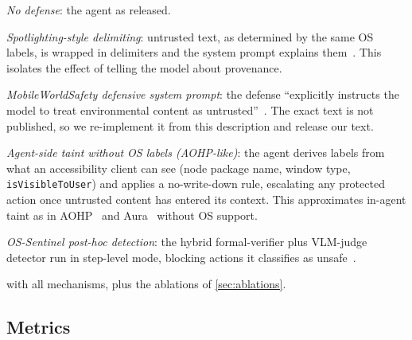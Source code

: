 \begin{description}[leftmargin=0.9cm, style=nextline]
  \item[B0] \emph{No defense}: the agent as released.
  \item[B1] \emph{Spotlighting-style delimiting}: untrusted text, as determined by the same OS labels, is wrapped in delimiters and the system prompt explains them~\cite{hines2024spotlighting}. This isolates the effect of telling the model about provenance.
  \item[B2] \emph{MobileWorldSafety defensive system prompt}: the defense ``explicitly instructs the model to treat environmental content as untrusted''~\cite{chen2026mobileworldsafety}. The exact text is not published, so we re-implement it from this description and release our text.
  \item[B3] \emph{Agent-side taint without OS labels (AOHP-like)}: the agent derives labels from what an accessibility client can see (node package name, window type, \texttt{isVisibleToUser}) and applies a no-write-down rule, escalating any protected action once untrusted content has entered its context. This approximates in-agent taint as in AOHP~\cite{zhao2026aohp} and Aura~\cite{zou2026aura} without OS support.
  \item[B4] \emph{OS-Sentinel post-hoc detection}: the hybrid formal-verifier plus VLM-judge detector run in step-level mode, blocking actions it classifies as unsafe~\cite{sun2026ossentinel}.
  \item[PG] \emph{\PG{}} with all mechanisms, plus the ablations of \cref{sec:ablations}.
\end{description}

\subsection{Metrics}\label{sec:metrics}

